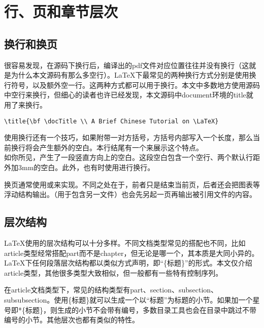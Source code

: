 \section{行、页和章节层次}

\subsection{换行和换页}

很容易发现，在源码下换行后，编译出的pdf文件对应位置往往并没有换行（这就是为什么本文源码有那么多空行）。\LaTeX 下最常见的两种换行方式分别是使用换行符号\textlb，以及额外空一行。这两种方式都可以用于换行。本文中多数地方使用源码中空行来换行，但细心的读者也许已经发现，本文源码中document环境的title就用了\textlb 来换行。

\begin{lstlisting}[style = latex_texworks, numbers = none]
\title{\bf \docTitle \\ A Brief Chinese Tutorial on \LaTeX}
\end{lstlisting}

使用\textlb 换行还有一个技巧，如果附带一对方括号，方括号内部写入一个长度，那么当前换行将会产生额外的空白。本行结尾有一个\textlb[3mm]来展示这个特点。\\[3mm]

如你所见，产生了一段竖直方向上的空白。这段空白包含一个空行、两个默认行距外加3mm的空白。此外，也有时使用进行换行。

换页通常使用或来实现。不同之处在于，前者只是结束当前页，后者还会把图表等浮动结构输出。（用于包含另一文件）也会先另起一页再输出被引用文件的内容。

\subsection{层次结构}

\LaTeX 使用的层次结构可以十分多样。不同文档类型常见的搭配也不同，比如article类型经常搭配part而不是chapter，但无论是哪一个，其本质是大同小异的。\LaTeX 下任何段落层次结构都以类似方式声明，即“\{标题\}”的形式。本文仅介绍article类型，其他很多类型大致相似，但一般都有一些特有控制序列。

在article文档类型下，常见的结构类型有part、section、subsection、subsubsection。使用\{标题\}就可以生成一个以“标题”为标题的小节。如果加一个星号即*\{标题\}，则生成的小节不会带有编号，多数目录工具也会在目录中跳过不带编号的小节。其他层次也都有类似的特性。


